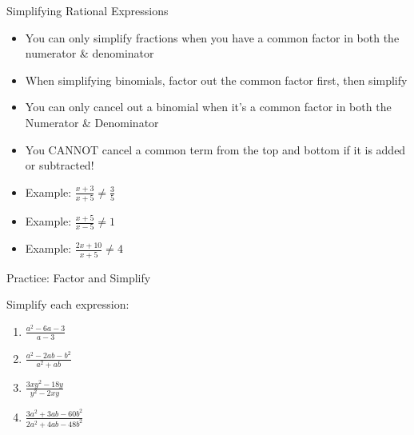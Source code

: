 \documentclass[aspectratio=169]{beamer}
\begin{document}
\begin{frame}{Simplifying Rational Expressions}
\begin{tcolorbox}[colback=lightgray,colframe=primary,title=Rules]
\footnotesize
\begin{itemize}
  \item You can only simplify fractions when you have a common factor in both the numerator \& denominator
  \item When simplifying binomials, factor out the common factor first, then simplify
  \item You can only cancel out a binomial when it's a common factor in both the Numerator \& Denominator
\end{itemize}
\end{tcolorbox}

\begin{tcolorbox}[colback=lightgray,colframe=accent,title=Common Mistakes]
\footnotesize
\begin{itemize}
  \item You CANNOT cancel a common term from the top and bottom if it is added or subtracted!
  \item Example: $\frac{x+3}{x+5} \neq \frac{3}{5}$
  \item Example: $\frac{x+5}{x-5} \neq 1$
  \item Example: $\frac{2x+10}{x+5} \neq 4$
\end{itemize}
\end{tcolorbox}
\end{frame}

\begin{frame}{Practice: Factor and Simplify}
\begin{tcolorbox}[colback=lightgray,colframe=primary,title=Problems]
\footnotesize
Simplify each expression:
\begin{enumerate}
  \item $\frac{a^2 - 6a - 3}{a - 3}$
  \item $\frac{a^2 - 2ab - b^2}{a^2 + ab}$
  \item $\frac{3xy^2 - 18y}{y^2 - 2xy}$
  \item $\frac{3a^2 + 3ab - 60b^2}{2a^2 + 4ab - 48b^2}$
\end{enumerate}
\end{tcolorbox}
\end{frame}
\end{document}
